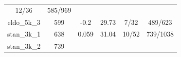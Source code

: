 \documentclass[]{article}
\begin{document}
\begin{longtable}[]{@{}cccccc@{}}
\begin{minipage}[t]{0.18\columnwidth}
12/36\strut
\end{minipage} & \begin{minipage}[t]{0.22\columnwidth}\centering\strut
585/969\strut
\end{minipage}\tabularnewline
\begin{minipage}[t]{0.11\columnwidth}\centering\strut
eldo\_5k\_3\strut
\end{minipage} & \begin{minipage}[t]{0.07\columnwidth}\centering\strut
599\strut
\end{minipage} & \begin{minipage}[t]{0.11\columnwidth}\centering\strut
-0.2\strut
\end{minipage} & \begin{minipage}[t]{0.13\columnwidth}\centering\strut
29.73\strut
\end{minipage} & \begin{minipage}[t]{0.18\columnwidth}\centering\strut
7/32\strut
\end{minipage} & \begin{minipage}[t]{0.22\columnwidth}\centering\strut
489/623\strut
\end{minipage}\tabularnewline
\begin{minipage}[t]{0.11\columnwidth}\centering\strut
stan\_3k\_1\strut
\end{minipage} & \begin{minipage}[t]{0.07\columnwidth}\centering\strut
638\strut
\end{minipage} & \begin{minipage}[t]{0.11\columnwidth}\centering\strut
0.059\strut
\end{minipage} & \begin{minipage}[t]{0.13\columnwidth}\centering\strut
31.04\strut
\end{minipage} & \begin{minipage}[t]{0.18\columnwidth}\centering\strut
10/52\strut
\end{minipage} & \begin{minipage}[t]{0.22\columnwidth}\centering\strut
739/1038\strut
\end{minipage}\tabularnewline
\begin{minipage}[t]{0.11\columnwidth}\centering\strut
stan\_3k\_2\strut
\end{minipage} & \begin{minipage}[t]{0.07\columnwidth}\centering\strut
739\strut
\end{minipage} & \begin{minipage}[t]{0.11\columnwidth}\centering\strut

\end{minipage}
\end{longtable}
\end{document}
